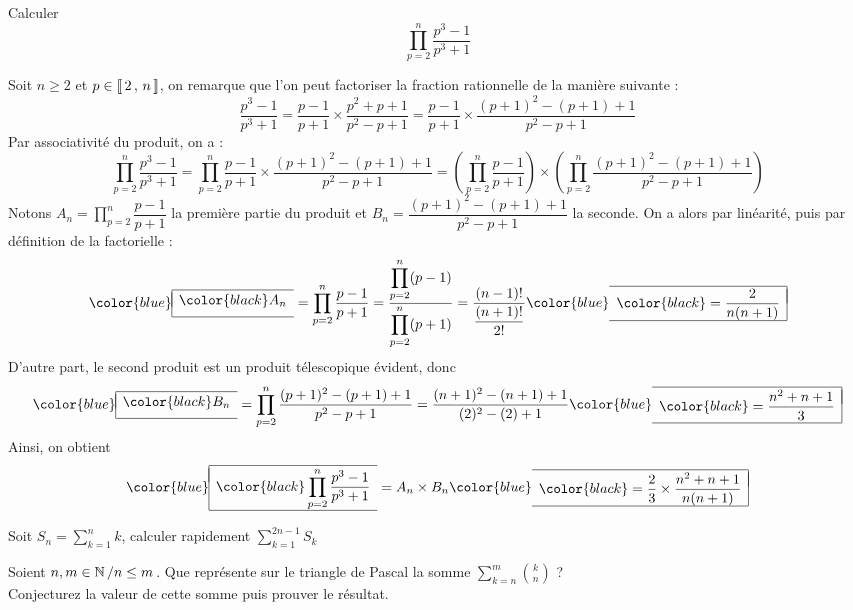 \documentclass[mathmodern,openany,11pt]{livre}
\newcommand{\lboxed}[1]{{\color{blue}\begin{array}{|l}\hline\\[-2.4ex]{\color{black}#1}\\[1.2ex]\hline\end{array}}}
\newcommand{\rboxed}[1]{{\color{blue}\begin{array}{r|}\hline\\[-2.4ex]{\color{black}#1}\\[1.2ex]\hline\end{array}}}
\begin{document}
\begin{exercice}
Calculer 
\[
\displaystyle\prod\limits_{p=2}^{n} \dfrac{p^3-1}{p^3+1}
\]
\end{exercice}

\begin{solution}
Soit $n \ge 2$ et $p \in \left\llbracket \, 2 \, , \, n \, \right\rrbracket$, on remarque que l'on peut factoriser la fraction rationnelle de la manière suivante :
\[
\dfrac{p^3-1}{p^3+1} 
= \dfrac{p-1}{p+1} \times \dfrac{p^2 + p + 1}{p^2 - p + 1} 
= \dfrac{p-1}{p+1} \times \dfrac{(p+1)^2 - (p + 1) + 1}{p^2 - p + 1}
\]
Par associativité du produit, on a :
\[
\displaystyle\prod\limits_{p=2}^{n} \dfrac{p^3-1}{p^3+1} 
=
\displaystyle\prod\limits_{p=2}^{n} \dfrac{p-1}{p+1} \times \dfrac{(p+1)^2 - (p + 1) + 1}{p^2 - p + 1}
= \left(\displaystyle\prod\limits_{p=2}^{n} \dfrac{p-1}{p+1}\right) 
\times 
\left(\displaystyle\prod\limits_{p=2}^{n} \dfrac{(p+1)^2 - (p + 1) + 1}{p^2 - p + 1}\right)
\]
Notons $A_n = \displaystyle\prod\limits_{p=2}^{n} \dfrac{p-1}{p+1}$ la première partie du produit et $B_n=\dfrac{(p+1)^2 - (p + 1) + 1}{p^2 - p + 1}$ la seconde.
On a alors par linéarité, puis par définition de la factorielle :
\[
\lboxed{A_n} 
= \displaystyle\prod\limits_{p=2}^{n}\dfrac{p-1}{p+1} 
= \dfrac{\displaystyle\prod\limits_{p=2}^{n}(p-1)}{\displaystyle\prod\limits_{p=2}^{n}(p+1)} 
= \dfrac{(n-1)!}{\dfrac{(n+1)!}{2!}} 
\rboxed{= \dfrac{2}{n(n+1)}}
\]
D'autre part, le second produit est un produit télescopique évident, donc
\[
\lboxed{B_n}
= \displaystyle\prod\limits_{p=2}^{n}\dfrac{(p+1)^2 - (p + 1) + 1}{p^2 - p + 1} 
= \dfrac{(n+1)^2 - (n + 1) + 1}{(2)^2 - (2) + 1} 
\rboxed{= \dfrac{n^2 + n + 1}{3}}
\]
Ainsi, on obtient 
\[
\lboxed{\displaystyle\prod\limits_{p=2}^{n}\dfrac{p^3-1}{p^3+1}} 
= A_n \times B_n 
\rboxed{= \dfrac{2}{3}\times \dfrac{n^2+n+1}{n(n+1)}}
\]
\end{solution}

\begin{exercice}
Soit $S_n=\displaystyle\sum\limits_{k=1}^{n} k$, calculer rapidement $\displaystyle\sum\limits_{k=1}^{2n-1} S_k$
\end{exercice}


\begin{exercice}
Soient $n,m\in\mathbb{N}\left/n \le m\right.$. Que représente sur le triangle de Pascal la somme $\displaystyle\sum\limits_{k=n}^{m} \binom{k}{n}$ ?\\
Conjecturez la valeur de cette somme puis prouver le résultat.
\end{exercice}
\end{document}
